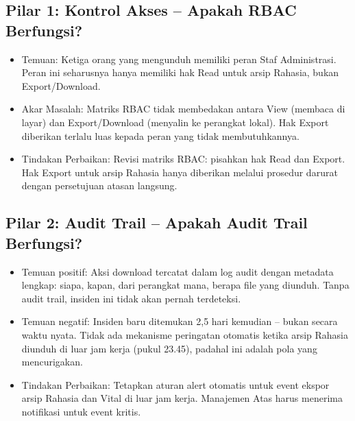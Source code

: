 \documentclass[12pt,a4paper]{report}
\begin{document}

\subsection{Pilar 1: Kontrol Akses -- Apakah RBAC Berfungsi?}
\begin{itemize}[leftmargin=*]
    \item Temuan: Ketiga orang yang mengunduh memiliki peran Staf Administrasi. Peran ini seharusnya hanya memiliki hak Read untuk arsip Rahasia, bukan Export/Download.
    \item Akar Masalah: Matriks RBAC tidak membedakan antara View (membaca di layar) dan Export/Download (menyalin ke perangkat lokal). Hak Export diberikan terlalu luas kepada peran yang tidak membutuhkannya.
    \item Tindakan Perbaikan: Revisi matriks RBAC: pisahkan hak Read dan Export. Hak Export untuk arsip Rahasia hanya diberikan melalui prosedur darurat dengan persetujuan atasan langsung.
\end{itemize}


\subsection{Pilar 2: Audit Trail -- Apakah Audit Trail Berfungsi?}
\begin{itemize}[leftmargin=*]
    \item Temuan positif: Aksi download tercatat dalam log audit dengan metadata lengkap: siapa, kapan, dari perangkat mana, berapa file yang diunduh. Tanpa audit trail, insiden ini tidak akan pernah terdeteksi.
    \item Temuan negatif: Insiden baru ditemukan 2,5 hari kemudian -- bukan secara waktu nyata. Tidak ada mekanisme peringatan otomatis ketika arsip Rahasia diunduh di luar jam kerja (pukul 23.45), padahal ini adalah pola yang mencurigakan.
    \item Tindakan Perbaikan: Tetapkan aturan alert otomatis untuk event ekspor arsip Rahasia dan Vital di luar jam kerja. Manajemen Atas harus menerima notifikasi untuk event kritis.
\end{itemize}

\end{document}
